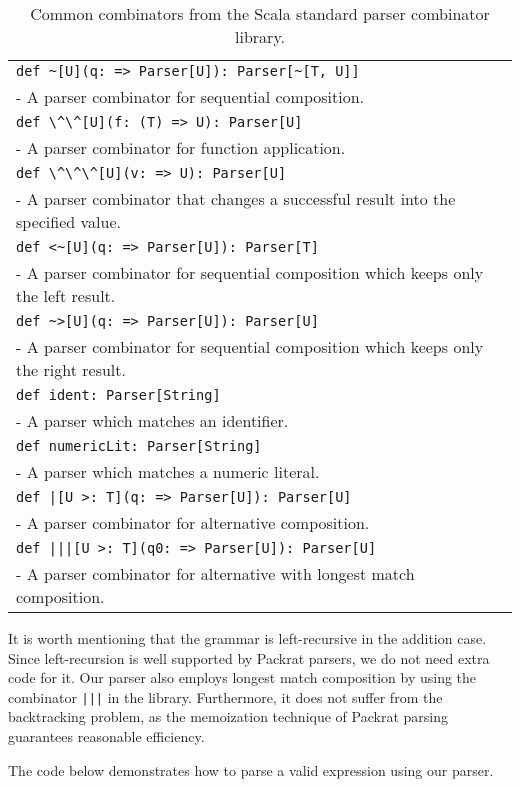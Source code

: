 \begin{table}
\begin{tabularx}{\linewidth}{X}
\hline
\lstinline{def ~[U](q: => Parser[U]): Parser[~[T, U]]} \\
- A parser combinator for sequential composition. \\ \hline
\lstinline{def \^\^[U](f: (T) => U): Parser[U]} \\
- A parser combinator for function application. \\ \hline
\lstinline{def \^\^\^[U](v: => U): Parser[U]} \\
- A parser combinator that changes a successful result into the specified value. \\ \hline
\lstinline{def <~[U](q: => Parser[U]): Parser[T]} \\
- A parser combinator for sequential composition which keeps only the left result. \\ \hline
\lstinline{def ~>[U](q: => Parser[U]): Parser[U]} \\
- A parser combinator for sequential composition which keeps only the right result. \\ \hline
\lstinline{def ident: Parser[String]} \\
- A parser which matches an identifier. \\ \hline
\lstinline{def numericLit: Parser[String]} \\
- A parser which matches a numeric literal. \\ \hline
\lstinline{def |[U >: T](q: => Parser[U]): Parser[U]} \\
- A parser combinator for alternative composition. \\ \hline
\lstinline{def |||[U >: T](q0: => Parser[U]): Parser[U]} \\
- A parser combinator for alternative with longest match composition. \\ \hline
\end{tabularx}
\caption{Common combinators from the Scala standard parser combinator library.}\label{tab:packrat}
\end{table}

It is worth mentioning that the grammar is left-recursive in the addition case. Since left-recursion is well supported by Packrat parsers, we do not need extra code for it. Our parser also employs longest match composition by using the combinator \lstinline{|||} in the library. Furthermore, it does not suffer from the backtracking problem, as the memoization technique of Packrat parsing guarantees reasonable efficiency.

The code below demonstrates how to parse a valid expression  using our parser.


